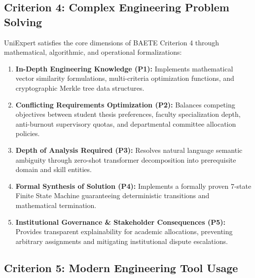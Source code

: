 \documentclass[10.5pt,a4paper]{article}
\begin{document}
\subsection{Criterion 4: Complex Engineering Problem Solving}
UniExpert satisfies the core dimensions of BAETE Criterion 4 through mathematical, algorithmic, and operational formalizations:
\begin{enumerate}[leftmargin=*]
    \item \textbf{In-Depth Engineering Knowledge (P1):} Implements mathematical vector similarity formulations, multi-criteria optimization functions, and cryptographic Merkle tree data structures.
    \item \textbf{Conflicting Requirements Optimization (P2):} Balances competing objectives between student thesis preferences, faculty specialization depth, anti-burnout supervisory quotas, and departmental committee allocation policies.
    \item \textbf{Depth of Analysis Required (P3):} Resolves natural language semantic ambiguity through zero-shot transformer decomposition into prerequisite domain and skill entities.
    \item \textbf{Formal Synthesis of Solution (P4):} Implements a formally proven 7-state Finite State Machine guaranteeing deterministic transitions and mathematical termination.
    \item \textbf{Institutional Governance \& Stakeholder Consequences (P5):} Provides transparent explainability for academic allocations, preventing arbitrary assignments and mitigating institutional dispute escalations.
\end{enumerate}

\subsection{Criterion 5: Modern Engineering Tool Usage}
\end{document}
